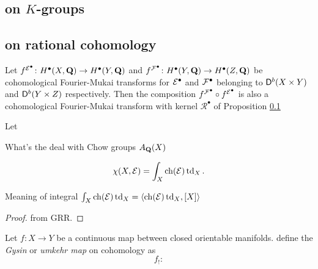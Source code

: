\subsection{on $K$-groups}


\subsection{on rational cohomology}
\label{Subsection: FM transform on cohomology}

\begin{proposition}
    \label{Composition of cohomological fm is fm}
    Let $f^{\mathcal E^\bullet} \colon H^\bullet(X, \mathbf Q) \to H^\bullet(Y, \mathbf Q)$ and $f^{\mathcal F^\bullet} \colon H^\bullet(Y, \mathbf Q) \to H^\bullet(Z, \mathbf Q)$ be cohomological Fourier-Mukai transforms for $\mathcal E^\bullet$ and $\mathcal F^\bullet$ belonging to $\mathsf{D}^b(X \times Y)$ and $\mathsf{D}^b(Y \times Z)$ respectively. Then the composition $f^{\mathcal F^\bullet} \circ f^{\mathcal E^\bullet}$ is also a cohomological Fourier-Mukai transform with kernel $\mathcal R^\bullet$ of Proposition \ref{}
\end{proposition}

\begin{theorem}
    \label{Grothendieck-Riemann-Roch}
    Let
\end{theorem}

\begin{remark}
    What's the deal with Chow groups $A_\mathbf Q(X)$    
\end{remark}

\begin{corollary}
    \label{Hirzebruch-Riemann-Roch}
    \[
        \chi(X, \E) = \int_X \ch{\E}\tdclass{X}.
    \]
\end{corollary}

\begin{remark}
    Meaning of integral $\int_X \ch{\E}\tdclass{X} = \pairing{\ch{\E}\tdclass{X}}{[X]}$
\end{remark}

\begin{proof}
    from GRR.
\end{proof}

\begin{definition}
    Let $f \colon X \to Y$ be a continuous map between closed orientable manifolds.  define the \emph{Gysin} or \emph{umkehr map} on cohomology as 
    \[
        f_! \colon
    \]
\end{definition}

